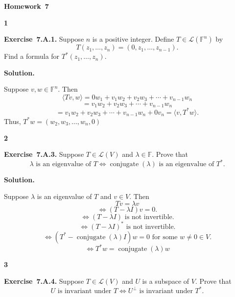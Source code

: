 \documentclass[11pt]{article}
\newcommand{\AssignmentType}{Homework}
\newcommand{\AssignmentNumber}{7}
\newcommand{\ProblemDivider}[1]{%
  \vspace{1.0em}
  \noindent\textbf{#1}\par
  \vspace{0.35em}
}
\newcommand{\ProblemAnnounce}{\noindent}
\newcommand{\SolutionAnnounce}{\noindent\textbf{Solution.}\par\medskip}
\newcommand{\Exercise}[1]{\textbf{Exercise~#1.}\;}
\newcommand{\F}{\mathbb{F}}
\newcommand{\LL}{\mathcal{L}}
\newcommand{\conjugate}{\operatorname{conjugate}}
\begin{document}
\begin{center}
  {\Large \textbf{\AssignmentType~\AssignmentNumber}}
\end{center}
\vspace{0.75em}

\ProblemDivider{1}

\begin{problemBox}
\ProblemAnnounce
\Exercise{7.A.1}
Suppose $n$ is a positive integer. Define $T \in \LL(\F^n)$ by
\[
T(z_1, \dots, z_n) = (0, z_1, \dots, z_{n-1}).
\]
Find a formula for $T^*(z_1, \dots, z_n)$.
\end{problemBox}

\begin{solutionBox}
\SolutionAnnounce
\doublespacing

Suppose $v,w \in \F^n$. Then
\[
\langle Tv,w\rangle = 0w_1 + v_1w_2 + v_2w_3 + \cdots + v_{n-1}w_n
\]
\[
= v_1w_2 + v_2w_3 + \cdots + v_{n-1}w_n
\]
\[
= v_1w_2 + v_2w_3 + \cdots + v_{n-1}w_n + 0v_n = \langle v,T^*w\rangle.
\]
Thus, $T^*w = (w_2,w_3,\dots,w_n,0)$

\end{solutionBox}

\ProblemDivider{2}

\begin{problemBox}
\ProblemAnnounce
\Exercise{7.A.3}
Suppose $T \in \LL(V)$ and $\lambda \in \F$. Prove that
\[
\lambda \text{ is an eigenvalue of } T \Longleftrightarrow \conjugate(\lambda) \text{ is an eigenvalue of } T^*.
\]
\end{problemBox}

\begin{solutionBox}
\SolutionAnnounce
\doublespacing

Suppose $\lambda$ is an eigenvalue of $T$ and $v \in V$. Then
\[
Tv = \lambda v
\]
\[
\Longleftrightarrow (T-\lambda I)v = 0.
\]
\[
\Longleftrightarrow (T-\lambda I) \text{ is not invertible}.
\]
\[
\Longleftrightarrow (T-\lambda I)^* \text{ is not invertible}.
\]
\[
\Longleftrightarrow (T^*-\conjugate(\lambda)I)w = 0 \text{ for some } w \neq 0 \in V.
\]
\[
\Longleftrightarrow T^*w = \conjugate(\lambda)w
\]

\end{solutionBox}

\ProblemDivider{3}

\begin{problemBox}
\ProblemAnnounce
\Exercise{7.A.4}
Suppose $T \in \LL(V)$ and $U$ is a subspace of $V$. Prove that
\[
U \text{ is invariant under } T \Longleftrightarrow U^\perp \text{ is invariant under } T^*.
\]
\end{problemBox}
\end{document}
